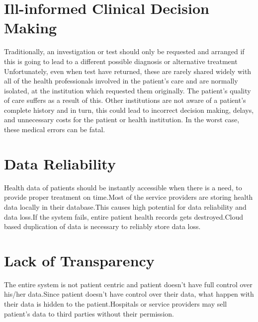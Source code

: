 \documentclass[12pt]{report}
\begin{document}
\section{Ill-informed Clinical Decision
Making \cite{3}}Traditionally, an investigation or test should only be requested and arranged if this is going
to lead to a different possible
diagnosis or alternative treatment Unfortunately, even when
test have returned, these are
rarely shared widely with all of
the health professionals involved
in the patient’s care and are
normally isolated, at the
institution which requested them
originally.
The patient’s quality of care
suffers as a result of this. Other
institutions are not aware of a
patient’s complete history and in
turn, this could lead to incorrect
decision making, delays, and
unnecessary costs for the patient
or health institution. In the worst
case, these medical errors can be
fatal.

\section{Data Reliability}
Health data of patients should be instantly accessible when there is a need, to provide proper treatment on time.Most of the service providers are storing health data locally in their database.This causes high potential for data reliability and data loss.If the system fails, entire patient health records gets destroyed.Cloud based duplication of data is necessary to reliably store data loss.

\section{Lack of Transparency}
The entire system is not patient centric and patient doesn't have full control over his/her data.Since patient doesn't have control over their data, what happen with their data is hidden to the patient.Hospitals or service providers may sell patient's data to third parties without their permission.
\end{document}
